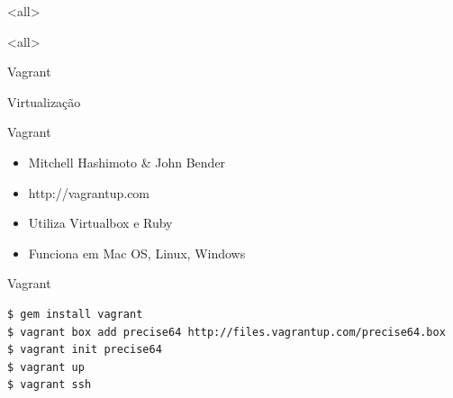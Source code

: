 \documentclass{beamer}
\begin{document}
\mode<all>
{
\begin{frame}[plain]
\end{frame}}
\mode<all>{\usebackgroundtemplate{}}
\mode*

\begin{frame}[plain,c]
  \begin{center}
    \Huge Vagrant
  \end{center}
  \begin{center}
    Virtualização
  \end{center}
\end{frame}

\begin{frame}[fragile]{Vagrant}
  \begin{itemize}
    \item Mitchell Hashimoto \& John Bender
    \item http://vagrantup.com
    \item Utiliza Virtualbox e Ruby
    \item Funciona em Mac OS, Linux, Windows
  \end{itemize}
\end{frame}

\begin{frame}[fragile]{Vagrant}
  \begin{verbatim}
$ gem install vagrant
$ vagrant box add precise64 http://files.vagrantup.com/precise64.box
$ vagrant init precise64
$ vagrant up
$ vagrant ssh
  \end{verbatim}
\end{frame}
\end{document}
